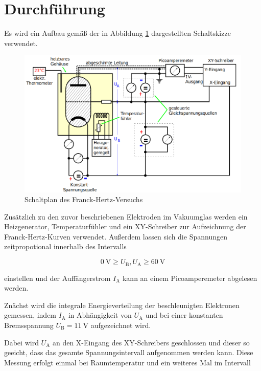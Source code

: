 \section{Durchführung}
\label{sec:Durchführung}

Es wird ein Aufbau gemäß der in Abbildung \ref{fig:bild4} dargestellten Schaltskizze
verwendet.

\begin{figure} [H]
    \centering
    \includegraphics{content/bild4.png}
    \caption{Schaltplan des Franck-Hertz-Versuchs}
    \label{fig:bild4}
  \end{figure}

  Zusätzlich zu den zuvor beschriebenen Elektroden im Vakuumglas werden
  ein Heizgenerator, Temperaturfühler und ein XY-Schreiber zur Aufzeichnung der
  Franck-Hertz-Kurven verwendet. Außerdem lassen sich die Spannungen zeitpropotional
  innerhalb des Intervalls

  \begin{equation*}
      \SI{0}{\volt} \geq U_\text{B}, U_\text{A} \geq \SI{60}{\volt}
  \end{equation*}

  einstellen und der Auffängerstrom $I_\text{A}$ kann an einem Picoamperemeter abgelesen werden.

  Znächst wird die integrale Energieverteilung der beschleunigten Elektronen gemessen, indem
  $I_\text{A}$ in Abhängigkeit von $U_\text{A}$ und bei einer konstanten
  Bremsspannung $U_\text{B} = \SI{11}{\volt}$ aufgezeichnet wird.

  Dabei wird $U_\text{A}$ an den X-Eingang des XY-Schreibers geschlossen und dieser so geeicht,
  dass das gesamte Spannungsintervall aufgenommen werden kann. Diese Messung erfolgt einmal
  bei Raumtemperatur und ein weiteres Mal im Intervall 

